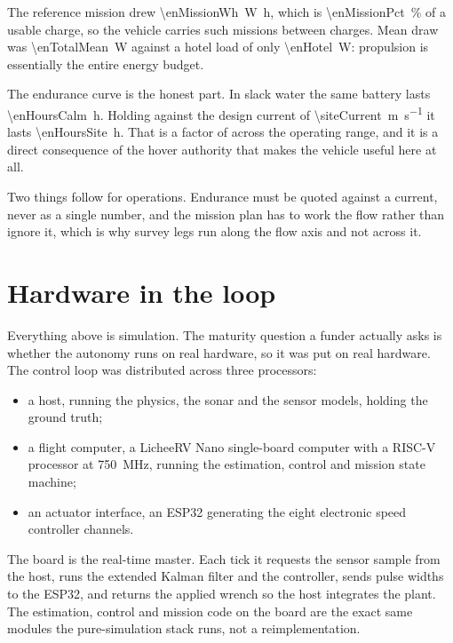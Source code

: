 \documentclass[10pt,a4paper]{article}
\begin{document}
The reference mission drew \SI{\enMissionWh}{\watt\hour}, which is
\SI{\enMissionPct}{\percent} of a usable charge, so the vehicle carries
\enMissions{} such missions between charges. Mean draw was
\SI{\enTotalMean}{\watt} against a hotel load of only
\SI{\enHotel}{\watt}: propulsion is essentially the entire energy budget.

The endurance curve is the honest part. In slack water the same battery lasts
\SI{\enHoursCalm}{\hour}. Holding against the design current of
\SI{\siteCurrent}{\metre\per\second} it lasts \SI{\enHoursSite}{\hour}. That is
a factor of \enRatio{} across the operating range, and it is a direct consequence
of the hover authority that makes the vehicle useful here at all.

Two things follow for operations. Endurance must be quoted against a current,
never as a single number, and the mission plan has to work the flow rather than
ignore it, which is why survey legs run along the flow axis and not across it.

\section{Hardware in the loop}\label{sec:hil}

Everything above is simulation. The maturity question a funder actually asks is
whether the autonomy runs on real hardware, so it was put on real hardware. The
control loop was distributed across three processors:

\begin{itemize}[leftmargin=*,itemsep=2pt]
\item a host, running the physics, the sonar and the sensor models, holding the
ground truth;
\item a flight computer, a LicheeRV Nano single-board computer with a RISC-V
processor at \SI{750}{\mega\hertz}, running the estimation, control and mission
state machine;
\item an actuator interface, an ESP32 generating the eight electronic speed
controller channels.
\end{itemize}

The board is the real-time master. Each tick it requests the sensor sample from
the host, runs the extended Kalman filter and the controller, sends pulse
widths to the ESP32, and returns the applied wrench so the host integrates the
plant. The estimation, control and mission code on the board are the exact same
modules the pure-simulation stack runs, not a reimplementation.
\end{document}
